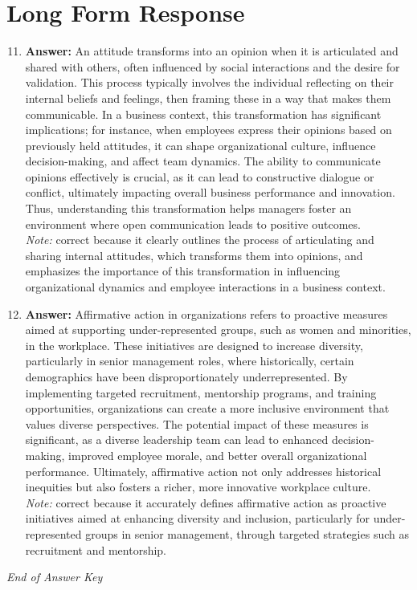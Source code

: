 \documentclass[12pt]{article}
\begin{document}
\section*{Long Form Response}
\begin{enumerate}[label=\arabic*.]
\setcounter{enumi}{10}
\item \textbf{Answer:} An attitude transforms into an opinion when it is articulated and shared with others, often influenced by social interactions and the desire for validation. This process typically involves the individual reflecting on their internal beliefs and feelings, then framing these in a way that makes them communicable. In a business context, this transformation has significant implications; for instance, when employees express their opinions based on previously held attitudes, it can shape organizational culture, influence decision-making, and affect team dynamics. The ability to communicate opinions effectively is crucial, as it can lead to constructive dialogue or conflict, ultimately impacting overall business performance and innovation. Thus, understanding this transformation helps managers foster an environment where open communication leads to positive outcomes.
\\ \textit{Note:} correct because it clearly outlines the process of articulating and sharing internal attitudes, which transforms them into opinions, and emphasizes the importance of this transformation in influencing organizational dynamics and employee interactions in a business context.
\item \textbf{Answer:} Affirmative action in organizations refers to proactive measures aimed at supporting under-represented groups, such as women and minorities, in the workplace. These initiatives are designed to increase diversity, particularly in senior management roles, where historically, certain demographics have been disproportionately underrepresented. By implementing targeted recruitment, mentorship programs, and training opportunities, organizations can create a more inclusive environment that values diverse perspectives. The potential impact of these measures is significant, as a diverse leadership team can lead to enhanced decision-making, improved employee morale, and better overall organizational performance. Ultimately, affirmative action not only addresses historical inequities but also fosters a richer, more innovative workplace culture.
\\ \textit{Note:} correct because it accurately defines affirmative action as proactive initiatives aimed at enhancing diversity and inclusion, particularly for under-represented groups in senior management, through targeted strategies such as recruitment and mentorship.
\end{enumerate}

\vfill
\noindent\textit{End of Answer Key}
\end{document}
